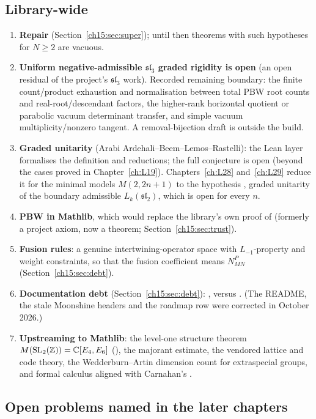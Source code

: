 \subsection{Library-wide}
\begin{enumerate}
\item \textbf{Repair } (Section~\ref{ch15:sec:super}); until then
  theorems with such hypotheses for $N\ge2$ are vacuous.
\item \textbf{Uniform negative-admissible $\mathfrak{sl}_3$ graded rigidity is open} (an open residual of the project's
  $\mathfrak{sl}_3$ work). Recorded remaining boundary: the finite count/product
  exhaustion and normalisation between total PBW root counts and real-root/descendant factors, the
  higher-rank horizontal quotient or parabolic vacuum determinant transfer, and simple vacuum
  multiplicity/nonzero tangent. A removal-bijection draft is outside the build.
\item \textbf{Graded unitarity} (Arabi Ardehali--Beem--Lemos--Rastelli): the Lean layer formalises the definition and
  reductions; the full conjecture is open (beyond the cases proved in Chapter~\ref{ch:L19}). Chapters~\ref{ch:L28}
  and~\ref{ch:L29} reduce it for the minimal models $M(2,2n+1)$ to the hypothesis , graded unitarity of the
  boundary admissible $L_k(\mathfrak{sl}_2)$, which is open for every $n$.
\item \textbf{PBW in Mathlib}, which would replace the library's own proof of  (formerly a project axiom, now a theorem; Section~\ref{ch15:sec:trust}).
\item \textbf{Fusion rules}: a genuine intertwining-operator space with $L_{-1}$-property and weight
  constraints, so that the fusion coefficient means $N^P_{MN}$ (Section~\ref{ch15:sec:debt}).
\item \textbf{Documentation debt} (Section~\ref{ch15:sec:debt}): ,  versus
  . (The README, the stale Moonshine headers and the roadmap row were corrected in October 2026.)
\item \textbf{Upstreaming to Mathlib}: the level-one structure theorem $M(\mathrm{SL}_2({\mathbb{Z}}))={\mathbb{C}}[E_4,E_6]$
  (), the majorant estimate, the vendored lattice and code theory,
  the Wedderburn--Artin dimension count for extraspecial groups, and formal calculus aligned with
  Carnahan's .
\end{enumerate}

\subsection{Open problems named in the later chapters}\label{ch15:sec:open-later}

